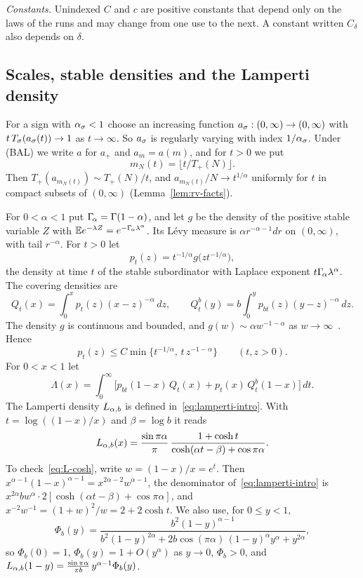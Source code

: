 \emph{Constants.} Unindexed $C$ and $c$ are positive constants that depend only on
the laws of the runs and may change from one use to the next. A constant written
$C_\delta$ also depends on $\delta$.

\subsection{Scales, stable densities and the Lamperti density}\label{sec:scales}

For a sign with $\alpha_\sigma<1$ choose an increasing function
$a_\sigma:(0,\infty)\to(0,\infty)$ with $t\,T_\sigma(a_\sigma(t))\to1$ as $t\to\infty$. So $a_\sigma$ is
regularly varying with index $1/\alpha_\sigma$. Under (BAL) we write $a$ for $a_\plus$ and
$a_m=a(m)$, and for $t>0$ we put
\[
 m_N(t)=\lfloor t/T_\plus(N)\rfloor .
\]
Then $T_\plus(a_{m_N(t)})\sim T_\plus(N)/t$, and $a_{m_N(t)}/N\to t^{1/\alpha}$ uniformly for $t$
in compact subsets of $(0,\infty)$ (Lemma~\ref{lem:rv-facts}).

For $0<\alpha<1$ put $\Gamma_{\!\alpha}=\Gamma(1-\alpha)$, and let $g$ be the density of the positive
stable variable $Z$ with $\mathbb{E} e^{-\lambda Z}=e^{-\Gamma_{\!\alpha}\lambda^\alpha}$. Its L\'evy measure is
$\alpha r^{-\alpha-1}dr$ on $(0,\infty)$, with tail $r^{-\alpha}$. For $t>0$ let
\[
 p_t(z)=t^{-1/\alpha}g\bigl(zt^{-1/\alpha}\bigr),
\]
the density at time $t$ of the stable subordinator with Laplace exponent
$t\Gamma_{\!\alpha}\lambda^\alpha$. The covering densities are
\begin{equation}\label{eq:covering}
 Q_t(x)=\int_0^xp_t(z)(x-z)^{-\alpha}\,dz,\qquad
 Q^b_t(y)=b\int_0^yp_{bt}(z)(y-z)^{-\alpha}\,dz .
\end{equation}
The density $g$ is continuous and bounded, and $g(w)\sim\alpha w^{-1-\alpha}$ as
$w\to\infty$~\cite[Section~XVII.6]{feller1971}. Hence
\begin{equation}\label{eq:p-bound}
 p_t(z)\le C\min\bigl\{t^{-1/\alpha},\,t\,z^{-1-\alpha}\bigr\}\qquad(t,z>0).
\end{equation}
For $0<x<1$ let
\begin{equation}\label{eq:Lambda}
 \Lambda(x)=\int_0^\infty\bigl[p_{bt}(1-x)\,Q_t(x)+p_t(x)\,Q^b_t(1-x)\bigr]\,dt .
\end{equation}
The Lamperti density $L_{\alpha,b}$ is defined in~\eqref{eq:lamperti-intro}. With
$t=\log((1-x)/x)$ and $\beta=\log b$ it reads
\begin{equation}\label{eq:L-cosh}
 L_{\alpha,b}(x)=\frac{\sin\pi\alpha}{\pi}\,\frac{1+\cosh t}{\cosh(\alpha t-\beta)+\cos\pi\alpha}.
\end{equation}
To check~\eqref{eq:L-cosh}, write $w=(1-x)/x=e^t$. Then
$x^{\alpha-1}(1-x)^{\alpha-1}=x^{2\alpha-2}w^{\alpha-1}$, the denominator
of~\eqref{eq:lamperti-intro} is $x^{2\alpha}bw^\alpha\cdot2[\cosh(\alpha t-\beta)+\cos\pi\alpha]$,
and $x^{-2}w^{-1}=(1+w)^2/w=2+2\cosh t$. We also use, for $0\le y<1$,
\begin{equation}\label{eq:Phi}
 \Phi_b(y)=\frac{b^2(1-y)^{\alpha-1}}{b^2(1-y)^{2\alpha}+2b\cos(\pi\alpha)\,(1-y)^\alpha y^\alpha+y^{2\alpha}},
\end{equation}
so $\Phi_b(0)=1$, $\Phi_b(y)=1+O(y^\alpha)$ as $y\to0$, $\Phi_b>0$, and
$L_{\alpha,b}(1-y)=\frac{\sin\pi\alpha}{\pi b}\,y^{\alpha-1}\Phi_b(y)$.

